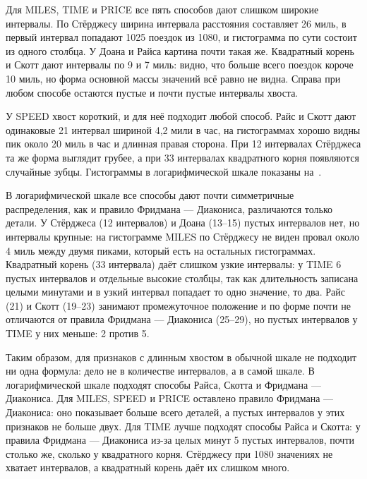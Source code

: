 \documentclass[a4paper,14pt]{extarticle}
\begin{document}

Для MILES, TIME и PRICE все пять способов дают слишком широкие интервалы. По Стёрджесу ширина интервала расстояния составляет 26 миль, в первый интервал попадают 1025 поездок из 1080, и гистограмма по сути состоит из одного столбца. У Доана и Райса картина почти такая же. Квадратный корень и Скотт дают интервалы по 9 и 7 миль: видно, что больше всего поездок короче 10 миль, но форма основной массы значений всё равно не видна. Справа при любом способе остаются пустые и почти пустые интервалы хвоста.

У SPEED хвост короткий, и для неё подходит любой способ. Райс и Скотт дают одинаковые 21 интервал шириной 4,2 мили в час, на гистограммах хорошо видны пик около 20 миль в час и длинная правая сторона. При 12 интервалах Стёрджеса та же форма выглядит грубее, а при 33 интервалах квадратного корня появляются случайные зубцы. Гистограммы в логарифмической шкале показаны на~.


В логарифмической шкале все способы дают почти симметричные распределения, как и правило Фридмана — Диакониса, различаются только детали. У Стёрджеса (12 интервалов) и Доана (13–15) пустых интервалов нет, но интервалы крупные: на гистограмме MILES по Стёрджесу не виден провал около 4 миль между двумя пиками, который есть на остальных гистограммах. Квадратный корень (33 интервала) даёт слишком узкие интервалы: у TIME 6 пустых интервалов и отдельные высокие столбцы, так как длительность записана целыми минутами и в узкий интервал попадает то одно значение, то два. Райс (21) и Скотт (19–23) занимают промежуточное положение и по форме почти не отличаются от правила Фридмана — Диакониса (25–29), но пустых интервалов у TIME у них меньше: 2 против 5.

Таким образом, для признаков с длинным хвостом в обычной шкале не подходит ни одна формула: дело не в количестве интервалов, а в самой шкале. В логарифмической шкале подходят способы Райса, Скотта и Фридмана — Диакониса. Для MILES, SPEED и PRICE оставлено правило Фридмана — Диакониса: оно показывает больше всего деталей, а пустых интервалов у этих признаков не больше двух. Для TIME лучше подходят способы Райса и Скотта: у правила Фридмана — Диакониса из-за целых минут 5 пустых интервалов, почти столько же, сколько у квадратного корня. Стёрджесу при 1080 значениях не хватает интервалов, а квадратный корень даёт их слишком много.
\end{document}
